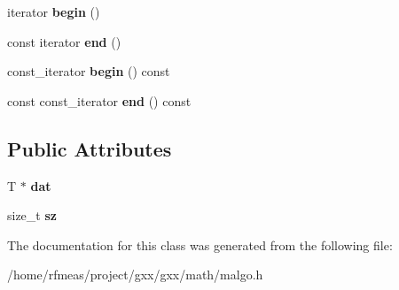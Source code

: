\begin{DoxyCompactItemize}
\item 
iterator {\bfseries begin} ()\hypertarget{classmalgo_1_1vector__compact__basic_a7230082e128aab48a6c9c9b2274c31d0}{}\label{classmalgo_1_1vector__compact__basic_a7230082e128aab48a6c9c9b2274c31d0}

\item 
const iterator {\bfseries end} ()\hypertarget{classmalgo_1_1vector__compact__basic_a5d212307d848efeda891f199d7b060a4}{}\label{classmalgo_1_1vector__compact__basic_a5d212307d848efeda891f199d7b060a4}

\item 
const\+\_\+iterator {\bfseries begin} () const \hypertarget{classmalgo_1_1vector__compact__basic_a245c951ff3af73fb8bc1fdfd78ee9321}{}\label{classmalgo_1_1vector__compact__basic_a245c951ff3af73fb8bc1fdfd78ee9321}

\item 
const const\+\_\+iterator {\bfseries end} () const \hypertarget{classmalgo_1_1vector__compact__basic_ad8345318cc7171a988e16268827e541f}{}\label{classmalgo_1_1vector__compact__basic_ad8345318cc7171a988e16268827e541f}

\end{DoxyCompactItemize}
\subsection*{Public Attributes}
\begin{DoxyCompactItemize}
\item 
T $\ast$ {\bfseries dat}\hypertarget{classmalgo_1_1vector__compact__basic_ac2f9b92b14c93321315159c963f2bc89}{}\label{classmalgo_1_1vector__compact__basic_ac2f9b92b14c93321315159c963f2bc89}

\item 
size\+\_\+t {\bfseries sz}\hypertarget{classmalgo_1_1vector__compact__basic_a95a2d009e2efd9e437172428a740342d}{}\label{classmalgo_1_1vector__compact__basic_a95a2d009e2efd9e437172428a740342d}

\end{DoxyCompactItemize}


The documentation for this class was generated from the following file\+:\begin{DoxyCompactItemize}
\item 
/home/rfmeas/project/gxx/gxx/math/malgo.\+h\end{DoxyCompactItemize}
